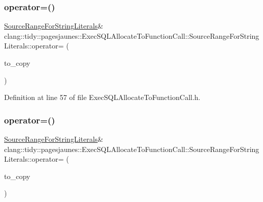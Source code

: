 \subsubsection{\texorpdfstring{operator=()}{operator=()}\hspace{0.1cm}{\footnotesize\ttfamily [1/2]}}
{\footnotesize\ttfamily \hyperlink{classclang_1_1tidy_1_1pagesjaunes_1_1_exec_s_q_l_allocate_to_function_call_1_1_source_range_for_string_literals}{Source\+Range\+For\+String\+Literals}\& clang\+::tidy\+::pagesjaunes\+::\+Exec\+S\+Q\+L\+Allocate\+To\+Function\+Call\+::\+Source\+Range\+For\+String\+Literals\+::operator= (\begin{DoxyParamCaption}\item[{const \hyperlink{classclang_1_1tidy_1_1pagesjaunes_1_1_exec_s_q_l_allocate_to_function_call_1_1_source_range_for_string_literals}{Source\+Range\+For\+String\+Literals} \&}]{to\+\_\+copy }\end{DoxyParamCaption})\hspace{0.3cm}{\ttfamily [inline]}}



Definition at line 57 of file Exec\+S\+Q\+L\+Allocate\+To\+Function\+Call.\+h.

\mbox{\label{classclang_1_1tidy_1_1pagesjaunes_1_1_exec_s_q_l_allocate_to_function_call_1_1_source_range_for_string_literals_a361e8548f6821e1fef104330e7f518fa}} 
\subsubsection{\texorpdfstring{operator=()}{operator=()}\hspace{0.1cm}{\footnotesize\ttfamily [2/2]}}
{\footnotesize\ttfamily \hyperlink{classclang_1_1tidy_1_1pagesjaunes_1_1_exec_s_q_l_allocate_to_function_call_1_1_source_range_for_string_literals}{Source\+Range\+For\+String\+Literals}\& clang\+::tidy\+::pagesjaunes\+::\+Exec\+S\+Q\+L\+Allocate\+To\+Function\+Call\+::\+Source\+Range\+For\+String\+Literals\+::operator= (\begin{DoxyParamCaption}\item[{\hyperlink{classclang_1_1tidy_1_1pagesjaunes_1_1_exec_s_q_l_allocate_to_function_call_1_1_source_range_for_string_literals}{Source\+Range\+For\+String\+Literals} \&}]{to\+\_\+copy }\end{DoxyParamCaption})\hspace{0.3cm}{\ttfamily [inline]}}



